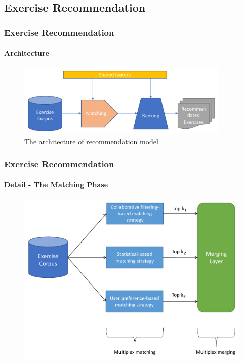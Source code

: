 \documentclass{beamer}
\begin{document}



\subsection{Exercise Recommendation}
\begin{frame}
  \frametitle{Exercise Recommendation}
  \framesubtitle{Architecture}
  \begin{figure}
    \includegraphics[width=0.9\textwidth]{figures/ch4-ov.pdf}
    \caption{The architecture of recommendation model}
  \end{figure}
\end{frame}

\begin{frame}
  \frametitle{Exercise Recommendation}
  \framesubtitle{Detail - The Matching Phase}
  \begin{figure}
    \centering
    \includegraphics[height=0.7\textheight]{figures/ch4-matching-model.pdf}
  \end{figure}
\end{frame}
\end{document}
